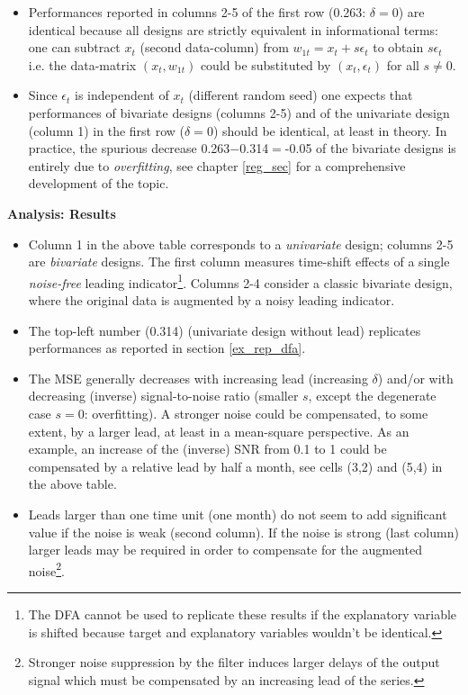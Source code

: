 \documentclass[a4paper]{book}
\begin{document}
\begin{enumerate}
\begin{itemize}
\item Performances reported in columns 2-5 of the first row (0.263: $\delta=0$) are identical because all designs are strictly equivalent in informational terms: one can subtract $x_t$ (second data-column) from $w_{1t}=x_t+s\epsilon_t$ to obtain $s\epsilon_t$ i.e. the data-matrix $(x_t,w_{1t})$ could be substituted by $(x_t,\epsilon_t)$ for all $s\neq 0$. 
\item Since $\epsilon_t$ is independent of $x_t$ (different random seed) one expects that performances of bivariate designs (columns 2-5) and of the univariate design (column 1) in the first row ($\delta=0$) should be identical, at least in theory. In practice, the spurious decrease 0.263$-$0.314$=$-0.05 of the bivariate designs is entirely due to \emph{overfitting}, see chapter \ref{reg_sec} for a comprehensive development of the topic. 
\end{itemize}
\textbf{Analysis: Results}
\begin{itemize}
\item Column 1 in the above table corresponds to a \emph{univariate} design; columns 2-5 are \emph{bivariate} designs. The first column measures time-shift effects of a single \emph{noise-free} leading indicator\footnote{The DFA cannot be used to replicate these results if the explanatory variable is shifted because target and explanatory variables wouldn't be identical.}. Columns 2-4 consider a classic bivariate design, where the original data is augmented by a noisy leading indicator.
\item The top-left number (0.314) (univariate design without lead) replicates performances as reported in section \ref{ex_rep_dfa}. 
\item The MSE generally decreases with increasing lead (increasing $\delta$) and/or with decreasing (inverse) signal-to-noise ratio (smaller $s$, except the degenerate case $s=0$: overfitting). A stronger noise could be compensated, to some extent, by a larger lead, at least in a mean-square perspective. As an example, an increase of the (inverse) SNR from 0.1 to 1 could be compensated by a relative lead by half a month, see cells (3,2) and (5,4) in the above table.
\item Leads larger than one time unit (one month) do not seem to add significant value if the noise is weak (second column). If the noise is strong (last column) larger leads may be required in order to compensate for the augmented noise\footnote{Stronger noise suppression by the filter induces larger delays of the output signal which must be compensated by an increasing lead of the series.}. 

\end{itemize}
\end{enumerate}
\end{document}
